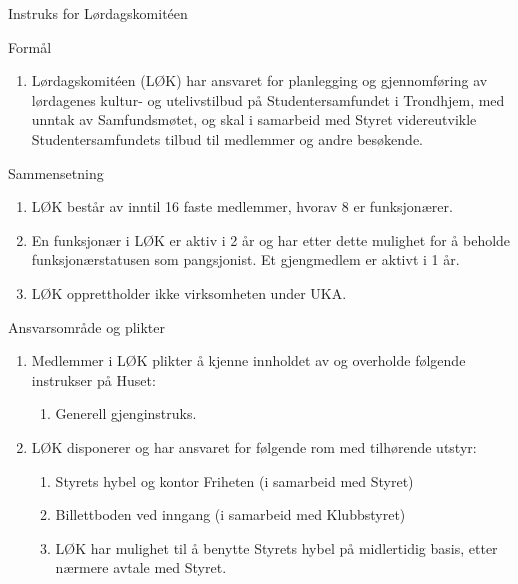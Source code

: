 \documentclass[../fsbok.tex]{subfiles}
\begin{document}
\begin{instruks*}{Instruks for Lørdagskomit\'een}

    \begin{instruksledd}{Formål}
        \begin{enumerate}
            \item Lørdagskomit\'een (LØK) har ansvaret for planlegging og gjennomføring av lørdagenes
                kultur- og
                utelivstilbud på Studentersamfundet i Trondhjem, med unntak av Samfundsmøtet, og skal i samarbeid
                med
                Styret videreutvikle Studentersamfundets tilbud til medlemmer og andre besøkende.
        \end{enumerate}
    \end{instruksledd}

    \begin{instruksledd}{Sammensetning}
        \begin{enumerate}
            \item LØK består av inntil 16 faste medlemmer, hvorav 8 er funksjonærer.
            \item En funksjonær i LØK er aktiv i 2 år og har etter dette mulighet for å beholde
                funksjonærstatusen som
                pangsjonist. Et gjengmedlem er aktivt i 1 år.
            \item LØK opprettholder ikke virksomheten under UKA.
        \end{enumerate}
    \end{instruksledd}

    \begin{instruksledd}{Ansvarsområde og plikter}
        \begin{enumerate}
            \item  Medlemmer i LØK plikter å kjenne innholdet av og overholde følgende instrukser på
                Huset:
                \begin{enumerate}
                    \item Generell gjenginstruks.
                \end{enumerate}
            \item LØK disponerer og har ansvaret for følgende rom med tilhørende utstyr:
                \begin{enumerate}
                    \item Styrets hybel og kontor Friheten (i samarbeid med Styret)
                    \item Billettboden ved inngang (i samarbeid med Klubbstyret)
                    \item LØK har mulighet til å benytte Styrets hybel på midlertidig basis, etter
                        nærmere avtale med Styret.
                \end{enumerate}
        \end{enumerate}
    \end{instruksledd}


\end{instruks*}
\end{document}
